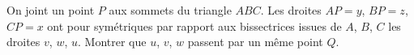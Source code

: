 On joint un point $P$ aux sommets du triangle $ABC$. Les droites $AP = y$, $BP = z$, $CP = x$ ont pour symétriques par rapport aux bissectrices issues de $A$, $B$, $C$ les droites $v$, $w$, $u$. Montrer que $u$, $v$, $w$ passent par un même point $Q$.
